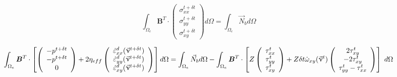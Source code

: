 \begin{equation}
\int_{\Omega_e} {\bm B}^T \cdot 
\left(
\begin{array}{c}
\sigma_{xx}^{t+\delta t}\\
\sigma_{yy}^{t+\delta t}\\
\sigma_{xy}^{t+\delta t}
\end{array}
\right)
d\Omega
=
\int_{\Omega_e} {\vec N}_b d\Omega 
\end{equation}


\begin{equation}
\int_{\Omega_e} {\bm B}^T \cdot 
\left[
\left(
\begin{array}{c}
-p^{t+\delta t} \\ -p^{t+\delta t} \\ 0
\end{array}
\right)
+
2 \eta_{eff}
\left(
\begin{array}{c}
\dot{\varepsilon}^d_{xx}(\vec\upnu^{t+\delta t})\\
\dot{\varepsilon}^d_{yy}(\vec\upnu^{t+\delta t})\\
\dot{\varepsilon}^d_{xy}(\vec\upnu^{t+\delta t})
\end{array}
\right)
\right]
d\Omega
=
\int_{\Omega_e} {\vec N}_b d\Omega
-
\int_{\Omega_e} {\bm B}^T \cdot 
\left[
Z
\left(
\begin{array}{c}
{\tau}_{xx}^t\\
{\tau}_{yy}^t\\
{\tau}_{xy}^t
\end{array}
\right)
+
Z \delta t \dot{\omega}_{xy}(\vec\upnu^t)
\left(
\begin{array}{c}
 2\tau_{xy}^t \\
-2\tau_{xy}^t \\
\tau_{yy}^t-\tau^t_{xx} 
\end{array}
\right)
\right]
\; d\Omega \nonumber 
\end{equation}

